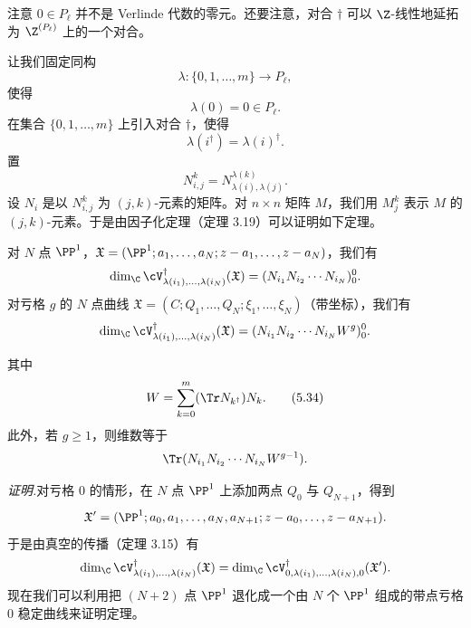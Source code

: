 注意 $0\in P_\ell$ 并不是 Verlinde 代数的零元。还要注意，对合 $\dagger$ 可以 $\Z$-线性地延拓为 $\Z^{(P_\ell)}$ 上的一个对合。

让我们固定同构
\[
\lambda:\{0,1,\dots,m\}\to P_\ell,
\]
使得
\[
\lambda(0)=0\in P_\ell.
\]
在集合 $\{0,1,\dots,m\}$ 上引入对合 $\dagger$，使得
\[
\lambda(i^\dagger)=\lambda(i)^\dagger.
\]
置
\begin{equation}
N^k_{i,j}=N^{\lambda(k)}_{\lambda(i),\lambda(j)}. \tag{5.33}
\end{equation}
设 $N_i$ 是以 $N^k_{i,j}$ 为 $(j,k)$-元素的矩阵。对 $n\times n$ 矩阵 $M$，我们用 $M^k_j$ 表示 $M$ 的 $(j,k)$-元素。于是由因子化定理（定理 3.19）可以证明如下定理。

\begin{theorem}[5.21]
对 $N$ 点 $\PP^1$，$\mathfrak X=(\PP^1;a_1,\dots,a_N;z-a_1,\dots,z-a_N)$，我们有
\[
\dim_{\C}\cV^\dagger_{\lambda(i_1),\dots,\lambda(i_N)}(\mathfrak X)
=(N_{i_1}N_{i_2}\cdots N_{i_N})^0_0.
\]
对亏格 $g$ 的 $N$ 点曲线 $\mathfrak X=(C;Q_1,\dots,Q_N;\xi_1,\dots,\xi_N)$（带坐标），我们有
\[
\dim_{\C}\cV^\dagger_{\lambda(i_1),\dots,\lambda(i_N)}(\mathfrak X)
=(N_{i_1}N_{i_2}\cdots N_{i_N}W^g)^0_0.
\]
\end{theorem}


其中
\begin{equation}
W=\sum_{k=0}^{m}(\Tr N_{k^\dagger})N_k. \tag{5.34}
\end{equation}
此外，若 $g\ge1$，则维数等于
\[
\Tr(N_{i_1}N_{i_2}\cdots N_{i_N}W^{g-1}).
\]

\noindent\textit{证明.}\quad 对亏格 $0$ 的情形，在 $N$ 点 $\PP^1$ 上添加两点 $Q_0$ 与 $Q_{N+1}$，得到
\[
\mathfrak X'=(\PP^1;a_0,a_1,\dots,a_N,a_{N+1};z-a_0,\dots,z-a_{N+1}).
\]
于是由真空的传播（定理 3.15）有
\[
\dim_{\C}\cV^\dagger_{\lambda(i_1),\dots,\lambda(i_N)}(\mathfrak X)
=\dim_{\C}\cV^\dagger_{0,\lambda(i_1),\dots,\lambda(i_N),0}(\mathfrak X').
\]
现在我们可以利用把 $(N+2)$ 点 $\PP^1$ 退化成一个由 $N$ 个 $\PP^1$ 组成的带点亏格 $0$ 稳定曲线来证明定理。


